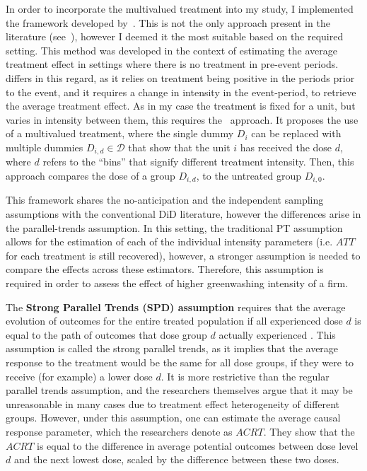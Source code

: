 \documentclass[12pt]{article}
\begin{document}
In order to incorporate the multivalued treatment into my study, I implemented the framework developed by~\textcite{callawayDifferenceindifferencesContinuousTreatment2024}. This is not the only approach present in the literature (see~\cite{dechaisemartinDifferenceinDifferenceEstimatorsContinuous2024}), however I deemed it the most suitable based on the required setting. This method was developed in the context of estimating the average treatment effect in settings where there is no treatment in pre-event periods.\@ \citeauthor{dechaisemartinDifferenceinDifferenceEstimatorsContinuous2024} differs in this regard, as it relies on treatment being positive in the periods prior to the event, and it requires a change in intensity in the event-period, to retrieve the average treatment effect. As in my case the treatment is fixed for a unit, but varies in intensity between them, this requires the~\textcite{callawayDifferenceindifferencesContinuousTreatment2024} approach. It proposes the use of a multivalued treatment, where the single dummy $D_i$ can be replaced with multiple dummies $D_{i,d} \in \mathcal{D}$ that show that the unit $i$ has received the dose $d$, where $d$ refers to the ``bins'' that signify different treatment intensity. Then, this approach compares the dose of a group $D_{i,d}$, to the untreated group $D_{i,0}$.

This framework shares the no-anticipation and the independent sampling assumptions with the conventional DiD literature, however the differences arise in the parallel-trends assumption. In this setting, the traditional PT assumption allows for the estimation of each of the individual intensity parameters (i.e. $ATT$ for each treatment is still recovered), however, a stronger assumption is needed to compare the effects across these estimators. Therefore, this assumption is required in order to assess the effect of higher greenwashing intensity of a firm.  

The \textbf{Strong Parallel Trends (SPD) assumption} requires that the average evolution of  outcomes for the entire treated population if all experienced dose $d$ is equal to the path of outcomes that dose group $d$ actually experienced \parencite{callawayDifferenceindifferencesContinuousTreatment2024}. This assumption is called the strong parallel trends, as it implies that the average response to the treatment would be the same for all dose groups, if they were to receive (for example) a lower dose $d$. It is more restrictive than the regular parallel trends assumption, and the researchers themselves argue that it may be unreasonable in many cases due to treatment effect heterogeneity of different groups. However, under this assumption, one can estimate the average causal response parameter, which the researchers denote as $ACRT$. They show that the $ACRT$ is equal to the difference in average potential outcomes between dose level $d$ and the next lowest dose, scaled by the difference between these two doses. 
\end{document}

